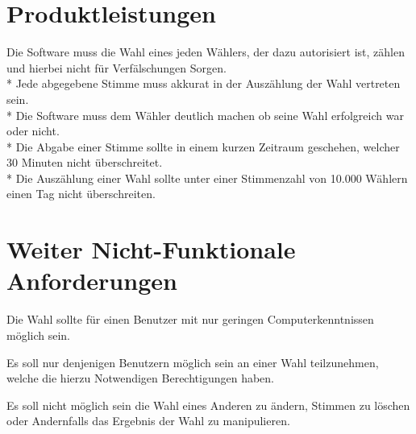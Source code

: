 \documentclass[parskip=full,11pt,twoside]{scrartcl}
\begin{document}
\section{Produktleistungen}
Die Software muss die Wahl eines jeden Wählers, der dazu autorisiert ist, zählen und hierbei nicht für Verfälschungen Sorgen. \\*
Jede abgegebene Stimme muss akkurat in der Auszählung der Wahl vertreten sein. \\*
Die Software muss dem Wähler deutlich machen ob seine Wahl erfolgreich war oder nicht. \\*
Die Abgabe einer Stimme sollte in einem kurzen Zeitraum geschehen, welcher 30 Minuten nicht überschreitet. \\*
Die Auszählung einer Wahl sollte unter einer Stimmenzahl von 10.000 Wählern einen Tag nicht überschreiten. 


\section{Weiter Nicht-Funktionale Anforderungen}

Die Wahl sollte für einen Benutzer mit nur geringen Computerkenntnissen möglich sein.

Es soll nur denjenigen Benutzern möglich sein an einer Wahl teilzunehmen, welche die hierzu Notwendigen Berechtigungen haben.

Es soll nicht möglich sein die Wahl eines Anderen zu ändern, Stimmen zu löschen oder Andernfalls das Ergebnis der Wahl zu manipulieren.
\end{document}
